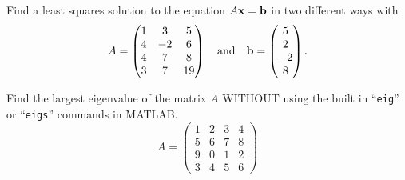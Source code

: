 \begin{problem}
    Find a least squares solution to the equation $A {\bf x} = {\bf b}$ in two different ways with 
    \[ A = \begin{pmatrix} 1 & 3 & 5 \\ 4 & -2 & 6 \\ 4 & 7 & 8 \\ 3 & 7 & 19
        \end{pmatrix} \quad \text{and} \quad {\bf b} = \begin{pmatrix} 5 \\ 2 \\ -2 \\
        8\end{pmatrix}. \]
\end{problem}

\begin{problem}
    Find the largest eigenvalue of the matrix $A$ WITHOUT using the built in
    ``\texttt{eig}'' or ``\texttt{eigs}'' commands in MATLAB.
    \[ A = \begin{pmatrix} 1 & 2 & 3 & 4 \\ 5 & 6 & 7 & 8 \\ 9 & 0 & 1 & 2 \\ 3 & 4 & 5 &
        6 \end{pmatrix} \]
\end{problem}


